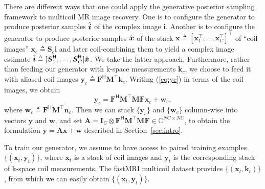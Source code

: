 \documentclass{article}
\theoremstyle{plain}
\theoremstyle{definition}
\theoremstyle{remark}
\newcommand{\defn}{\triangleq}
\newcommand{\hvec}[1]{\ensuremath{\Hat{\boldsymbol{#1}}}}
\renewcommand{\vec}[1]{\ensuremath{\boldsymbol{#1}}}
\newcommand{\Complex}{{\mathbb{C}}}
\newcommand{\tran}{^{\top}}
\newcommand{\herm}{^{\textsf{H}}}
\renewcommand{\eqref}[1]{(\ref{eq:#1})}
\newcommand{\secref}[1]{Section~\ref{sec:#1}}
\begin{document}
There are different ways that one could apply the generative posterior sampling framework to multicoil MR image recovery.
One is to configure the generator to produce posterior samples $\hvec{i}$ of the complex image $\vec{i}$. Another is to configure the generator to produce posterior samples $\hvec{x}$ of the stack $\vec{x}\defn [\vec{x}_1\tran,\dots,\vec{x}_C\tran]\tran$ of ``coil images'' $\vec{x}_c\defn\vec{S}_c\vec{i}$ and later coil-combining them to yield a complex image estimate $\hvec{i}\defn [\vec{S}\herm_1,\dots,\vec{S}\herm_C]\hvec{x}$.
We take the latter approach.
Furthermore, rather than feeding our generator with k-space measurements $\vec{k}_c$, we choose to feed it with aliased coil images $\vec{y}_c\defn \vec{F}\herm\vec{M}\tran\vec{k}_c$.
Writing \eqref{yc} in terms of the coil images, we obtain
\begin{equation} 
\vec{y}_c = \vec{F}\herm\vec{M}\tran\vec{MFx}_c + \vec{w}_c
\label{eq:yc2},
\end{equation}
where $\vec{w}_c\defn \vec{F}\herm\vec{M}\tran\vec{n}_c$.
Then we can stack $\{\vec{y}_c\}$ and $\{\vec{w}_c\}$ column-wise into vectors $\vec{y}$ and $\vec{w}$, and set $\vec{A} = \vec{I}_C \otimes \vec{F}\herm\vec{M}\tran\vec{MF}\in\Complex^{NC\times NC}$, to obtain the formulation $\vec{y} = \vec{Ax}+\vec{w}$ described in \secref{intro}.

To train our generator, we assume to have access to paired training examples $\{(\vec{x}_t,\vec{y}_t)\}$, where $\vec{x}_t$ is a stack of coil images and $\vec{y}_t$ is the corresponding stack of k-space coil measurements. 
The fastMRI multicoil dataset \cite{Zbontar:18} provides $\{(\vec{x}_t,\vec{k}_t)\}$, from which we can easily obtain $\{(\vec{x}_t,\vec{y}_t)\}$. 

\end{document}
